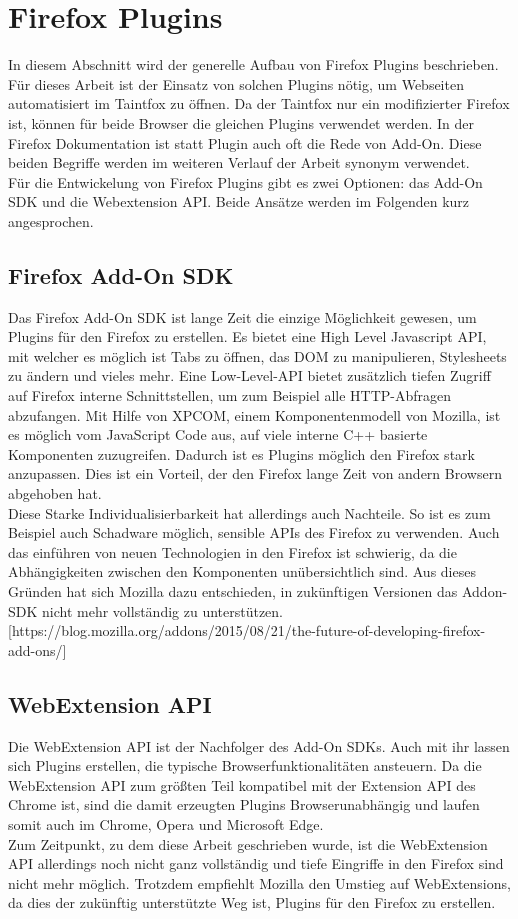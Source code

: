 \section{Firefox Plugins}
In diesem Abschnitt wird der generelle Aufbau von Firefox Plugins beschrieben. Für dieses Arbeit ist der Einsatz von solchen Plugins nötig, um Webseiten automatisiert im Taintfox zu öffnen. Da der Taintfox nur ein modifizierter Firefox ist, können für beide Browser die gleichen Plugins verwendet werden. In der Firefox Dokumentation ist statt Plugin auch oft die Rede von Add-On. Diese beiden Begriffe werden im weiteren Verlauf der Arbeit synonym verwendet. \\
Für die Entwickelung von Firefox Plugins gibt es zwei Optionen: das Add-On SDK und die Webextension API. Beide Ansätze werden im Folgenden kurz angesprochen.
\subsection{Firefox Add-On SDK}
Das Firefox Add-On SDK ist lange Zeit die einzige Möglichkeit gewesen, um Plugins für den Firefox zu erstellen. Es bietet eine High Level Javascript API, mit welcher es möglich ist Tabs zu öffnen, das DOM zu manipulieren, Stylesheets zu ändern und vieles mehr. Eine Low-Level-API bietet zusätzlich tiefen Zugriff auf Firefox interne Schnittstellen, um zum Beispiel alle HTTP-Abfragen abzufangen. Mit Hilfe von XPCOM, einem Komponentenmodell von Mozilla, ist es möglich vom JavaScript Code aus, auf viele interne C++ basierte Komponenten zuzugreifen. Dadurch ist es Plugins möglich den Firefox stark anzupassen. Dies ist ein Vorteil, der den Firefox lange Zeit von andern Browsern abgehoben hat. \\
Diese Starke Individualisierbarkeit hat allerdings auch Nachteile. So ist es zum Beispiel auch Schadware möglich, sensible APIs des Firefox zu verwenden. Auch das einführen von neuen Technologien in den Firefox ist schwierig, da die Abhängigkeiten zwischen den Komponenten unübersichtlich sind. Aus dieses Gründen hat sich Mozilla dazu entschieden, in zukünftigen Versionen das Addon-SDK nicht mehr vollständig zu unterstützen. [https://blog.mozilla.org/addons/2015/08/21/the-future-of-developing-firefox-add-ons/]
\subsection{WebExtension API}
Die WebExtension API ist der Nachfolger des Add-On SDKs. Auch mit ihr lassen sich Plugins erstellen, die typische Browserfunktionalitäten ansteuern. Da die WebExtension API zum größten Teil kompatibel mit der Extension API des Chrome ist, sind die damit erzeugten Plugins Browserunabhängig und laufen somit auch im Chrome, Opera und Microsoft Edge. \\
Zum Zeitpunkt, zu dem diese Arbeit geschrieben wurde, ist die WebExtension API allerdings noch nicht ganz vollständig und tiefe Eingriffe in den Firefox sind nicht mehr möglich. Trotzdem empfiehlt Mozilla den Umstieg auf WebExtensions, da dies der zukünftig unterstützte Weg ist, Plugins für den Firefox zu erstellen.

